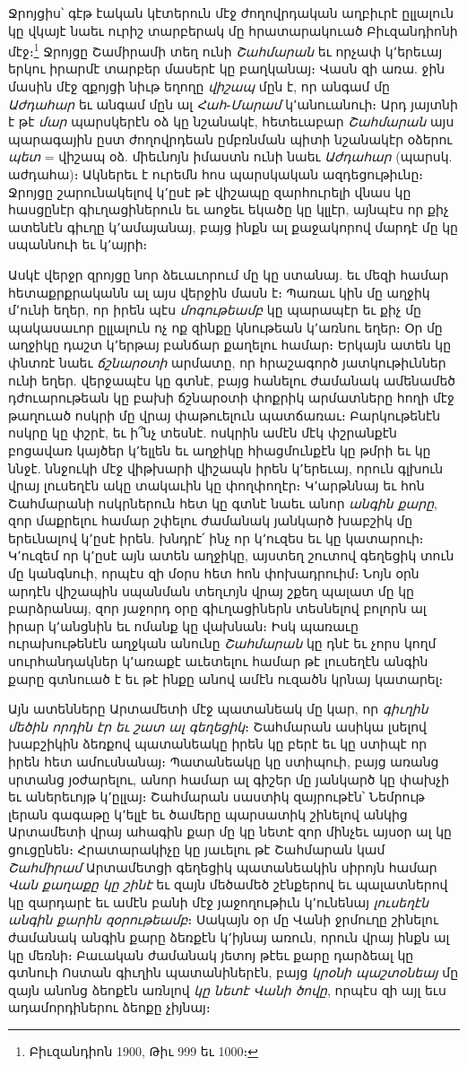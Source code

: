 \documentclass{article}
\begin{document}
{Ջրոյցիս՝ գէթ էական կէտերուն մէջ ժողովրդական աղբիւրէ ըլլալուն կը վկայէ նաեւ ուրիշ տարբերակ մը հրատարակուած Բիւզանդիոնի մէջ։\footnote{Բիւզանդիոն 1900, Թիւ 999 եւ 1000։} Ջրոյցը Շամիրամի տեղ ունի \emph{Շահմարան} եւ որչափ կ՚երեւայ երկու իրարմէ տարբեր մասերէ կը բաղկանայ։ Վասն զի առա. ջին մասին մէջ զքոյցի նիւթ եղողը \emph{վիշապ} մըն է, որ անգամ մը \emph{Աժդահար} եւ անգամ մըն ալ \emph{Հահ}֊\emph{Մարամ} կ՚անուանուի։ Արդ յայտնի է թէ \emph{մար} պարսկերէն օձ կը նշանակէ, հետեւաբար \emph{Շահմարան} այս պարագային ըստ ժողովրդեան ըմբռնման պիտի նշանակէր օձերու \emph{պետ} = վիշապ օձ. միեւնոյն իմաստն ունի նաեւ \emph{Աժդահար} (պարսկ. աժդահա)։ Ակներեւ է ուրեմն հոս պարսկական ազդեցութիւնը։ Ջրոյցը շարունակելով կ՚ըսէ թէ վիշապը զարհուրելի վնաս կը հասցընէր գիւղացիներուն եւ աոջեւ եկածը կը կլլէր, այնպէս որ քիչ ատենէն գիւղը կ՚ամայանայ, բայց ինքն ալ քաջակորով մարդէ մը կը սպաննուի եւ կ՚այրի։

Ասկէ վերջր զրոյցը նոր ձեւաւորում մը կը ստանայ. եւ մեզի համար հետաքրքրականն ալ այս վերջին մասն է։ Պառաւ կին մը աղջիկ մ՚ունի եղեր, որ իրեն պէս \emph{մոգութեամբ} կը պարապէր եւ քիչ մը պակասաւոր ըլլալուն ոչ ոք զինքը կնութեան կ՚առնու եղեր։ Օր մը աղջիկը դաշտ կ՚երթայ բանճար քաղելու համար։ Երկայն ատեն կը փնտռէ նաեւ \emph{ճշնարօտի} արմատը, որ հրաշագործ յատկութիւններ ունի եղեր. վերջապէս կը գտնէ, բայց հանելու ժամանակ ամենամեծ դժուարութեան կը բախի ճշնարօտի փոքրիկ արմատները հողի մէջ թաղուած ոսկրի մը վրայ փաթուելուն պատճառաւ։ Բարկութենէն ոսկրը կը փշրէ, եւ ի՞նչ տեսնէ. ոսկրին ամէն մէկ փշրանքէն բոցավառ կայծեր կ՚ելլեն եւ աղջիկը հիացմունքէն կը թմրի եւ կը ննջէ. ննջուկի մէջ վիթխարի վիշապն իրեն կ՚երեւայ, որուն գլխուն վրայ լուսեղէն ակը տակաւին կը փողփողէր։ Կ՚արթննայ եւ հոն Շահմարանի ոսկրներուն հետ կը գտնէ նաեւ անոր \emph{անգին քարը}, զոր մաքրելու համար շփելու ժամանակ յանկարծ խաբշիկ մը երեւնալով կ՚ըսէ իրեն. խնդրէ՛ ինչ որ կ՚ուզես եւ կը կատարուի։ Կ՚ուզեմ որ կ՚ըսէ այն ատեն աղջիկը, այստեղ շուտով գեղեցիկ տուն մը կանգնուի, որպէս զի մօրս հետ հոն փոխադրուիմ։ Նոյն օրն արդէն վիշապին սպանման տեղւոյն վրայ շքեղ պալատ մը կը բարձրանայ, զոր յաջորդ օրը գիւղացիներն տեսնելով բոլորն ալ իրար կ՚անցնին եւ ոմանք կը վախնան։ Իսկ պառաւը ուրախութենէն աղջկան անունը \emph{Շահմարան} կը դնէ եւ չորս կողմ սուրհանդակներ կ՚առաքէ աւետելու համար թէ լուսեղէն անգին քարը գտնուած է եւ թէ ինքը անով ամէն ուզածն կրնայ կատարել։

Այն ատենները Արտամետի մէջ պատանեակ մը կար, որ \emph{գիւղին մեծին որդին էր եւ շատ ալ գեղեցիկ}։ Շահմարան ասիկա լսելով խաբշիկին ձեռքով պատանեակը իրեն կը բերէ եւ կը ստիպէ որ իրեն հետ ամուսնանայ։ Պատանեակը կը ստիպուի, բայց առանց սրտանց յօժարելու, անոր համար ալ գիշեր մը յանկարծ կը փախչի եւ աներեւոյթ կ՚ըլլայ։ Շահմարան սաստիկ զայրութէն՝ Նեմրութ լերան գագաթը կ՚ելլէ եւ ծամերը պարսատիկ շինելով անկից Արտամետի վրայ ահագին քար մը կը նետէ զոր մինչեւ այսօր ալ կը ցուցընեն։ Հրատարակիչը կը յաւելու թէ Շահմարան կամ \emph{Շահմիրամ} Արտամետցի գեղեցիկ պատանեակին սիրոյն համար \emph{Վան քաղաքը կը շինէ} եւ զայն մեծամեծ շէնքերով եւ պալատներով կը զարդարէ եւ ամէն բանի մէջ յաջողութիւն կ՚ունենայ \emph{լուսեղէն անգին քարին զօրութեամբ}։ Սակայն օր մը Վանի ջրմուղը շինելու ժամանակ անգին քարը ձեռքէն կ՚իյնայ առուն, որուն վրայ ինքն ալ կը մեռնի։ Բաւական ժամանակ յետոյ թէեւ քարը դարձեալ կը գտնուի Ոստան գիւղին պատանիներէն, բայց \emph{կրօնի պաշտօնեայ} մը զայն անոնց ձեոքէն առնլով \emph{կը նետէ Վանի ծովը}, որպէս զի այլ եւս ադամորդիներու ձեոքը չիյնայ։

}
\end{document}

